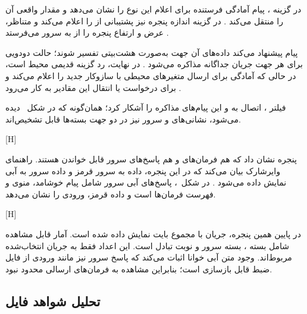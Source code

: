 در گزینه ، پیام  آمادگی فرستنده برای اعلام این نوع را نشان می‌دهد
و  مقدار واقعی آن را منتقل می‌کند .
در گزینه اندازه پنجره نیز  پشتیبانی از  را
اعلام می‌کند و  متناظر، عرض و ارتفاع پنجره را از  به سرور می‌فرستد .

پیام  پیشنهاد می‌کند داده‌های آن جهت به‌صورت هشت‌بیتی تفسیر
شوند؛ حالت دودویی برای هر جهت جریان جداگانه مذاکره می‌شود . در نهایت،
 رد گزینه قدیمی محیط است، در حالی که
 آمادگی برای ارسال متغیرهای محیطی
با سازوکار جدید را اعلام
می‌کند و  برای درخواست یا انتقال این مقادیر به کار
می‌رود .

فیلتر ، اتصال به  و این پیام‌های مذاکره را آشکار کرد؛
همان‌گونه که در شکل~ دیده می‌شود، نشانی‌های  و سرور نیز در
دو جهت بسته‌ها قابل تشخیص‌اند.

[H]

پنجره  نشان داد که هم فرمان‌های  و هم پاسخ‌های سرور قابل خواندن
هستند. راهنمای وایرشارک بیان می‌کند که در این پنجره، داده  به سرور قرمز و داده سرور به
 آبی نمایش داده می‌شود . در شکل~، پاسخ‌های آبی
سرور شامل پیام خوشامد، منوی  و فهرست فرمان‌ها است و داده قرمز، ورودی  را نشان می‌دهد.

[H]

در پایین همین پنجره، جریان  با مجموع  بایت نمایش داده شده است. آمار قابل مشاهده
شامل  بسته ،  بسته سرور و  نوبت تبادل است. این اعداد فقط به جریان
انتخاب‌شده مربوط‌اند. وجود متن آبی خوانا اثبات می‌کند که پاسخ سرور نیز مانند ورودی  از فایل
ضبط قابل بازسازی است؛ بنابراین مشاهده به فرمان‌های ارسالی محدود نبود.

\subsection{تحلیل شواهد فایل }

